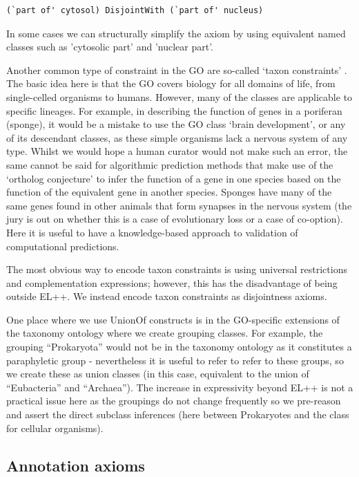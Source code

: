 \documentclass{llncs}
\begin{document}
\begin{verbatim}
(`part of' cytosol) DisjointWith (`part of' nucleus)
\end{verbatim}

In some cases we can structurally simplify the axiom by using
equivalent named classes such as 'cytosolic part' and 'nuclear part'.

Another common type of constraint in the GO are so-called `taxon
constraints' \cite{Deegan2010}. The basic idea here is that the GO
covers biology for all domains of life, from single-celled organisms
to humans. However, many of the classes are applicable to specific
lineages. For example, in describing the function of genes in a
poriferan (sponge), it would be a mistake to use the GO class ‘brain
development’, or any of its descendant classes, as these simple
organisms lack a nervous system of any type. Whilst we would hope a
human curator would not make such an error, the same cannot be said
for algorithmic prediction methods that make use of the `ortholog
conjecture'\cite{Thomas2012} to infer the function of a gene in one
species based on the function of the equivalent gene in another
species. Sponges have many of the same genes found in other animals
that form synapses in the nervous system (the jury is out on whether
this is a case of evolutionary loss or a case of co-option). Here it
is useful to have a knowledge-based approach to validation of
computational predictions.

The most obvious way to encode taxon constraints is using universal
restrictions and complementation expressions; however, this has the
disadvantage of being outside EL++. We instead encode taxon
constraints as disjointness axioms\cite{taxonOWL}.

One place where we use UnionOf constructs is in the GO-specific
extensions of the taxonomy ontology where we create grouping
classes. For example, the grouping ``Prokaryota'' would not be
in the taxonomy ontology as it constitutes a paraphyletic group -
nevertheless it is useful to refer to refer to these groups, so we
create these as union classes (in this case, equivalent to the union
of ``Eubacteria'' and ``Archaea''). The increase in expressivity
beyond EL++ is not a practical issue here as the groupings do not
change frequently so we pre-reason and assert the direct subclass
inferences (here between Prokaryotes and the class for cellular
organisms).

\subsection{Annotation axioms}
\end{document}
